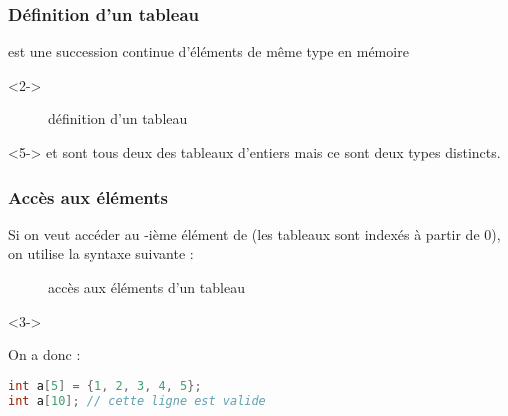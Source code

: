 \documentclass{cppcourses}
\begin{document}
\begin{frame}

\frametitle{Définition d'un tableau}

\begin{definition}
 est une succession continue d'éléments de même type en mémoire
\end{definition}

\begin{uncoverenv}<2->

\begin{figure}
\mykeyword{\textcolor{red}{<type>} \textcolor{blue}{<identifiant>}[\textcolor{teal}{<taille>}];}
\caption{définition d'un tableau}
\end{figure}

\end{uncoverenv}




\begin{example}<5->
 et  sont tous deux des tableaux d'entiers mais ce sont deux types distincts.
\end{example}

\end{frame}

\begin{frame}[fragile]

\frametitle{Accès aux éléments}

Si on veut accéder au \mykeyword{\textcolor{teal}{n}}-ième élément de \mykeyword{\textcolor{red}{identifiant}} (les tableaux sont indexés à partir de 0), on utilise la syntaxe suivante :

\begin{figure}
\mykeyword{\textcolor{blue}{<identifiant>}[\textcolor{teal}{<n>}];}
\caption{accès aux éléments d'un tableau}
\end{figure}


\begin{example}<3->

On a donc :

\begin{lstlisting}[language = c++]
int a[5] = {1, 2, 3, 4, 5};
int a[10]; // cette ligne est valide
\end{lstlisting}

\end{example}

\end{frame}
\end{document}
